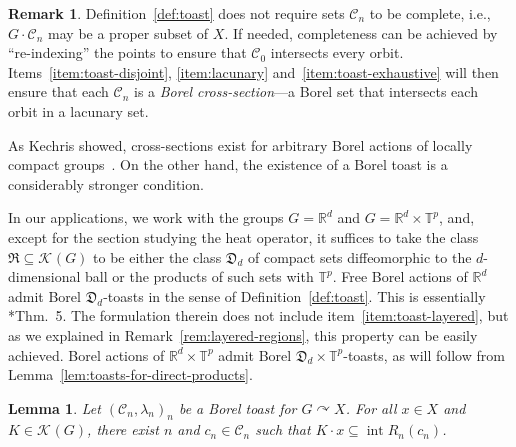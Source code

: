 \documentclass[12pt]{paper}
\numberwithin{equation}{section}
\theoremstyle{plain}
\newtheorem{lemma}[theorem]{Lemma}
\theoremstyle{definition}
\newtheorem{remark}[theorem]{Remark}
\newcommand{\Rd}{\mathbb{R}^{d}}
\newcommand{\T}{\mathbb{T}}
\newcommand{\mfD}{\mathfrak{D}}
\newcommand{\mfR}{\mathfrak{R}}
\newcommand{\vietoris}[2][]{\mathcal{K}_{#1}(#2)}
\DeclareMathOperator{\inter}{\mathrm{int}}
\newcommand{\acts}{\curvearrowright}
\begin{document}
\begin{remark}
  \label{rem:cross-section-re-indexing}
  Definition~\ref{def:toast} does not require sets \(\mathcal{C}_n\) to be complete, i.e.,
  \(G \cdot \mathcal{C}_{n}\) may be a proper subset of \(X\).  If needed, completeness can be
  achieved by ``re-indexing'' the points to ensure that \(\mathcal{C}_{0}\) intersects every orbit.
  Items~\eqref{item:toast-disjoint}, \eqref{item:lacunary} and~\eqref{item:toast-exhaustive} will
  then ensure that each \(\mathcal{C}_n\) is a \emph{Borel cross-section}---a Borel set that
  intersects each orbit in a lacunary set.

  As Kechris showed, cross-sections exist for arbitrary Borel actions of locally compact
  groups~\cite{kechrisCountableSectionsLocally1992}. On the other hand, the existence of a Borel
  toast is a considerably stronger condition.

  In our applications, we work with the groups \(G=\Rd\) and \(G=\Rd\times \T^p\), and, except
  for the section studying the heat operator, it suffices to take the class
  \(\mfR \subseteq \vietoris{G}\) to be either the class \(\mfD_{d}\) of compact sets diffeomorphic
  to the \(d\)-dimensional ball or the products of such sets with \(\T^p\).  Free Borel actions of
  \(\Rd\) admit Borel \(\mfD_{d}\)-toasts in the sense of Definition~\ref{def:toast}.  This is
  essentially \cite{MR4215747}*{Thm.~5}.  The formulation therein does not include
  item~\eqref{item:toast-layered}, but as we explained in Remark~\ref{rem:layered-regions}, this
  property can be easily achieved.  Borel actions of \(\Rd \times \T^{p}\) admit Borel
  \(\mfD_{d} \times \T^{p}\)-toasts, as will follow from Lemma~\ref{lem:toasts-for-direct-products}.
\end{remark}


\begin{lemma}
  \label{lem:exhaustive-taust}
  Let \((\mathcal{C}_{n},\lambda_{n})_{n}\) be a Borel toast for \(G \acts X\).  For all \(x \in X\)
  and \(K \in \vietoris{G}\), there exist \(n\) and \(c_{n} \in \mathcal{C}_{n}\) such that
  \(K \cdot x \subseteq \inter R_{n}(c_{n})\).
\end{lemma}
\end{document}
